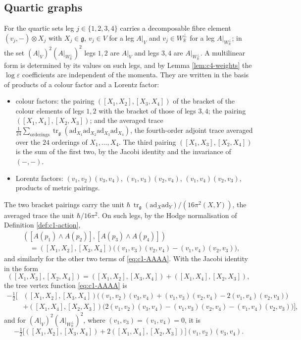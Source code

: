 \subsection{Quartic graphs}

For the quartic sets leg $j\in\{1,2,3,4\}$ carries a decomposable fibre element $(v_j,-)\otimes X_j$ with $X_j\in\mathfrak g$, $v_j\in V$ for a leg $A|_V$ and $v_j\in W_{\mathbb R}^\perp$ for a leg $A|_{W_{\mathbb R}^\perp}$; in the set $(A|_V)^2(A|_{W_{\mathbb R}^\perp})^2$ legs $1,2$ are $A|_V$ and legs $3,4$ are $A|_{W_{\mathbb R}^\perp}$. A multilinear form is determined by its values on such legs, and by Lemma \ref{lem:c4-weights} the $\log\varepsilon$ coefficients are independent of the momenta. They are written in the basis of products of a colour factor and a Lorentz factor:
\begin{itemize}
\item colour factors: the pairing $([X_1,X_2],[X_3,X_4])$ of the bracket of the colour elements of legs $1,2$ with the bracket of those of legs $3,4$; the pairing $([X_1,X_4],[X_2,X_3])$; and the averaged trace $\tfrac1{24}\sum_{\text{orderings}}\operatorname{tr}_{\mathfrak g}(\mathrm{ad}_{X_1}\mathrm{ad}_{X_2}\mathrm{ad}_{X_3}\mathrm{ad}_{X_4})$, the fourth-order adjoint trace averaged over the $24$ orderings of $X_1,\dots,X_4$. The third pairing $([X_1,X_3],[X_2,X_4])$ is the sum of the first two, by the Jacobi identity and the invariance of $(-,-)$.
\item Lorentz factors: $(v_1,v_2)(v_3,v_4)$, $(v_1,v_3)(v_2,v_4)$, $(v_1,v_4)(v_2,v_3)$, products of metric pairings.
\end{itemize}
The two bracket pairings carry the unit $\hbar\,\operatorname{tr}_{\mathfrak g}(\mathrm{ad}_X\mathrm{ad}_Y)/(16\pi^2(X,Y))$, the averaged trace the unit $\hbar/16\pi^2$. On such legs, by the Hodge normalisation of Definition \ref{def:c1-action},
\[
\begin{aligned}
&([A(p_1)\wedge A(p_2)],[A(p_3)\wedge A(p_4)])\\
&\quad=([X_1,X_2],[X_3,X_4])\big((v_1,v_3)(v_2,v_4)-(v_1,v_4)(v_2,v_3)\big),
\end{aligned}
\]
and similarly for the other two terms of \eqref{eq:c1-AAAA}. With the Jacobi identity in the form
\[
([X_1,X_3],[X_2,X_4])=([X_1,X_2],[X_3,X_4])+([X_1,X_4],[X_2,X_3]),
\]
the tree vertex function \eqref{eq:c1-AAAA} is
\begin{equation}
\begin{aligned}
-\tfrac12\Big[&([X_1,X_2],[X_3,X_4])\big((v_1,v_2)(v_3,v_4)+(v_1,v_3)(v_2,v_4)-2(v_1,v_4)(v_2,v_3)\big)\\
&+([X_1,X_4],[X_2,X_3])\big(2(v_1,v_2)(v_3,v_4)-(v_1,v_3)(v_2,v_4)-(v_1,v_4)(v_2,v_3)\big)\Big],
\end{aligned}
\label{eq:c4-tree4}
\end{equation}
and for $(A|_V)^2(A|_{W_{\mathbb R}^\perp})^2$, where $(v_1,v_3)=(v_1,v_4)=0$, it is
\[
-\tfrac12\big[([X_1,X_2],[X_3,X_4])+2([X_1,X_4],[X_2,X_3])\big](v_1,v_2)(v_3,v_4).
\]

